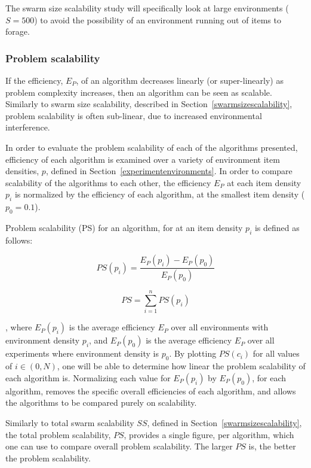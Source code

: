 The swarm size scalability study will specifically look at large environments ($S=500$) to avoid the possibility of an environment running out of items to forage.

\subsubsection{Problem scalability}
\label{setup:problemscalability}
If the efficiency, $E_P$, of an algorithm decreases linearly (or super-linearly) as problem complexity increases, then an algorithm can be seen as scalable. Similarly to swarm size scalability, described in Section~\ref{swarmsizescalability}, problem scalability is often sub-linear, due to increased environmental interference.

In order to evaluate the problem scalability of each of the algorithms presented, efficiency of each algorithm is examined over a variety of environment item densities, $p$, defined in Section~\ref{experimentenvironments}. In order to compare scalability of the algorithms to each other, the efficiency $E_P$ at each item density $p_i$ is normalized by the efficiency of each algorithm, at the smallest item density ($p_0=0.1$). 

Problem scalability (PS) for an algorithm, for at an item density $p_i$ is defined as follows:

\begin{equation}
	PS(p_i) = \dfrac{E_P(p_i)-E_P(p_0)}{E_P(p_0)}
\end{equation}

\begin{equation}
	PS = \sum_{i=1}^{n} PS(p_i)
\end{equation}

, where $E_P(p_i)$ is the average efficiency $E_P$ over all environments with environment density $p_i$, and $E_P(p_0)$ is the average efficiency $E_P$ over all experiments where environment density is $p_0$. By plotting $PS(c_i)$ for all values of $i\in(0,N)$, one will be able to determine how linear the problem scalability of each algorithm is. Normalizing each value for $E_P(p_i)$ by $E_P(p_0)$, for each algorithm, removes the specific overall efficiencies of each algorithm, and allows the algorithms to be compared purely on scalability.

Similarly to total swarm scalability $SS$, defined in Section~\ref{swarmsizescalability}, the total problem scalability, $PS$, provides a single figure, per algorithm, which one can use to compare overall problem scalability. The larger $PS$ is, the better the problem scalability.

